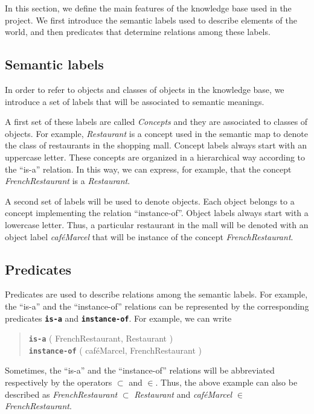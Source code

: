 \documentclass{article}
\begin{document}
In this section, we define the main features of the knowledge base used in the project. We first introduce the semantic labels used to describe elements of the world, and then predicates that determine relations among these labels.

\subsection{Semantic labels}

In order to refer to objects and classes of objects in the knowledge base, we introduce a set of labels that will be associated to semantic meanings. 

A first set of these labels are called \emph{Concepts} and they are associated to classes of objects. For example, \emph{Restaurant} is a concept used in the semantic map to denote the class of restaurants in the shopping mall. Concept labels always start with an uppercase letter.
These concepts are organized in a hierarchical way according to the ``is-a'' relation.
In this way, we can express, for example, that the concept \emph{FrenchRestaurant} is a \emph{Restaurant}. 

A second set of labels will be used to denote objects. Each object belongs to a concept implementing the relation ``instance-of''. Object labels always start with a lowercase letter.
Thus, a particular restaurant in the mall will be denoted with an object label \emph{caf\'eMarcel} that will be instance of the concept \emph{FrenchRestaurant}. 


\subsection{Predicates}

Predicates are used to describe relations among the semantic labels. For example, the ``is-a'' and the ``instance-of'' relations can be represented by the corresponding predicates {\tt\bf is-a} and {\tt\bf instance-of}. For example, we can write

\begin{quote}
{\tt\bf is-a} ( FrenchRestaurant, Restaurant )\\
{\tt\bf instance-of} ( caf\'eMarcel, FrenchRestaurant )\\
\end{quote}

Sometimes,  the ``is-a'' and the ``instance-of'' relations will be abbreviated respectively by
the operators $\subset$ and $\in$.
Thus, the above example can also be described as \emph{FrenchRestaurant} $\subset$ \emph{Restaurant} and \emph{caf\'eMarcel} $\in$ \emph{FrenchRestaurant}.
\end{document}
